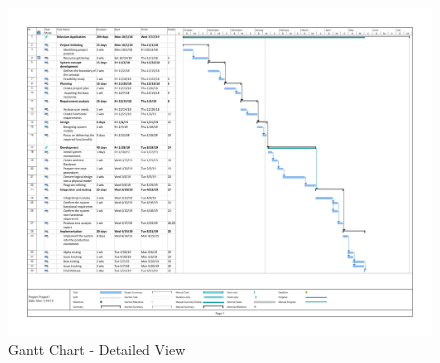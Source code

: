 \documentclass{scrreprt}
\begin{document}
\clearpage
\begin{figure}[ht!]
    \centering
    \includegraphics[angle=90, height=\textheight]{gantt/gantt_scale.pdf}
    \caption{Gantt Chart - Detailed View}
    \label{fig:gantt2}
\end{figure}








\end{document}
